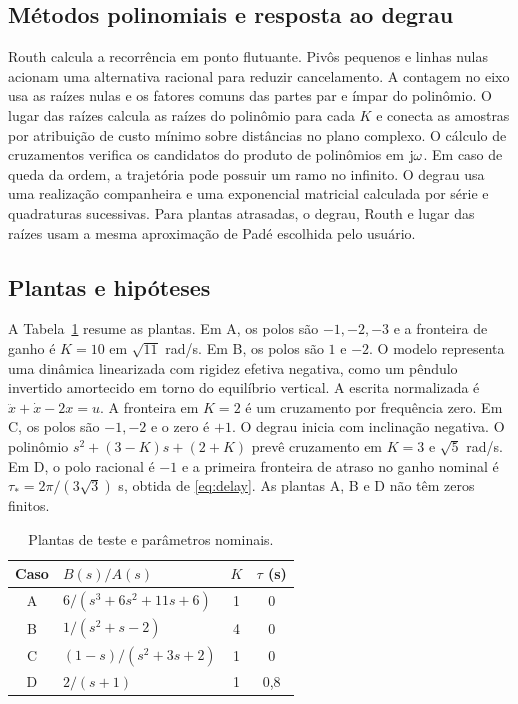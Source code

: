 \subsection{Métodos polinomiais e resposta ao degrau}
Routh calcula a recorrência em ponto flutuante. Pivôs pequenos e
linhas nulas acionam uma alternativa racional para reduzir cancelamento.
A contagem no eixo usa as raízes nulas e os fatores comuns das partes
par e ímpar do polinômio. O lugar das raízes calcula as raízes
do polinômio para cada $K$ e conecta as amostras por atribuição
de custo mínimo sobre distâncias no plano complexo. O cálculo de
cruzamentos verifica os candidatos do produto de polinômios em
$\mathrm{j}\omega$. Em caso de queda da ordem, a trajetória pode possuir
um ramo no infinito. O degrau usa uma realização companheira e uma
exponencial matricial calculada por série e quadraturas sucessivas.
Para plantas atrasadas, o degrau, Routh e lugar das raízes usam a
mesma aproximação de Padé escolhida pelo usuário.

\subsection{Plantas e hipóteses}
A Tabela~\ref{tab:systems} resume as plantas. Em A, os polos são
$-1,-2,-3$ e a fronteira de ganho é $K=10$ em $\sqrt{11}$ rad/s.
Em B, os polos são $1$ e $-2$. O modelo representa uma dinâmica
linearizada com rigidez efetiva negativa, como um pêndulo
invertido amortecido em torno do equilíbrio vertical. A escrita
normalizada é $\ddot x+\dot x-2x=u$. A fronteira em $K=2$ é
um cruzamento por frequência zero. Em C, os polos são $-1,-2$
e o zero é $+1$. O degrau inicia com inclinação negativa.
O polinômio $s^2+(3-K)s+(2+K)$ prevê cruzamento em $K=3$ e
$\sqrt5$ rad/s. Em D, o polo racional é $-1$ e a
primeira fronteira de atraso no ganho nominal é
$\tau_*=2\pi/(3\sqrt3)$ s, obtida de \eqref{eq:delay}.
As plantas A, B e D não têm zeros finitos.

\begin{table}[!t]
\centering
\caption{Plantas de teste e parâmetros nominais.}
\label{tab:systems}
\begin{tabular}{clcc}
\toprule
Caso & $B(s)/A(s)$ & $K$ & $\tau$ (s)\\
\midrule
A & $6/(s^3+6s^2+11s+6)$ & 1 & 0\\
B & $1/(s^2+s-2)$ & 4 & 0\\
C & $(1-s)/(s^2+3s+2)$ & 1 & 0\\
D & $2/(s+1)$ & 1 & 0,8\\
\bottomrule
\end{tabular}
\end{table}

